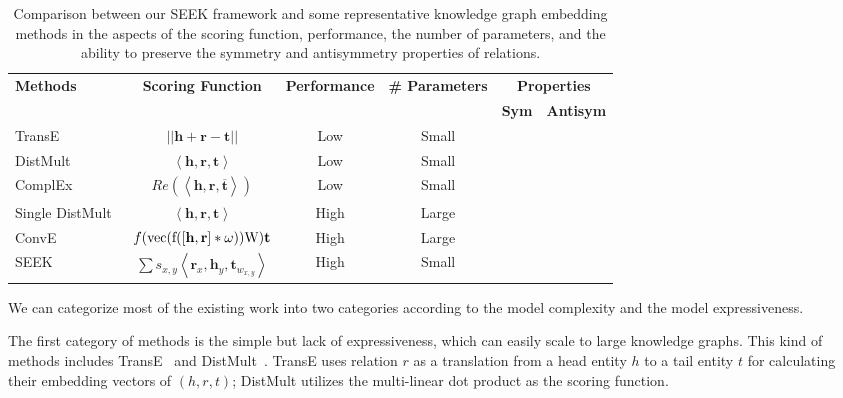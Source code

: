 \documentclass[11pt,a4paper]{article}
\newcommand{\cmark}{\text{\ding{51}}}
\newcommand{\xmark}{\text{\ding{55}}}
\newcommand{\SegVec}[1]{\mathbf{#1}}
\newcommand{\TableSize}{\footnotesize} \renewcommand{\thefootnote}{\fnsymbol{footnote}}
\begin{document}
\begin{table*}[!h]
	\centering
	\TableSize
	\begin{tabular}{ l |c| c | c | c c}
		\toprule
		\multirow{2}{*}{\textbf{Methods}} & \multirow{2}{*}{\textbf{Scoring Function}} &  \multirow{2}{*}{\textbf{Performance}} & \multirow{2}{*}{\textbf{\# Parameters}} &\multicolumn{2}{c}{\textbf{Properties}} \\
		\cmidrule{5-6}
		& & & & \textbf{Sym}  & \textbf{Antisym}\\
		\midrule
		TransE~\cite{bordes2013translating} & $||\SegVec{h} + \SegVec{r} -\SegVec{t}||$ & Low & Small & \xmark & \cmark\\
		DistMult~\cite{yang2015embedding} & $\left< \SegVec{h}, \SegVec{r}, \SegVec{t} \right>$ & Low  & Small & \cmark & \xmark\\
ComplEx~\cite{trouillon2016complex} & $Re(\left<\SegVec{h}, \SegVec{r}, \overline{\SegVec{t}} \right>)$ & Low   & Small  & \cmark & \cmark\\
		Single DistMult~\cite{kadlec2017knowledge} &$\left< \SegVec{h}, \SegVec{r}, \SegVec{t} \right>$ & High  & Large & \cmark & \xmark\\
		ConvE~\cite{dettmers2018conve} & $f(\rm{vec}(f([\SegVec{h},\SegVec{r}]*\omega))\rm{W})\SegVec{t}$& High  & Large & \xmark &  \cmark\\
		\midrule
		SEEK & $\sum s_{x, y} \left< \SegVec{r}_x, \SegVec{h}_y, \SegVec{t}_{w_{x, y}} \right>$  & High  & Small & \cmark & \cmark\\
		\bottomrule
	\end{tabular}
	\caption{Comparison between our SEEK framework and some representative knowledge graph embedding methods in the aspects of the scoring function, performance, the number of parameters, and the ability to preserve the symmetry and antisymmetry properties of relations.}	
	\label{tab:compare}
\end{table*}

We can categorize most of the existing work into two categories according to the model complexity and the model expressiveness.

The first category of methods is the simple but lack of expressiveness, which can easily scale to large knowledge graphs. This kind of methods includes TransE~\cite{bordes2013translating} and DistMult~\cite{yang2015embedding}. TransE uses relation $r$ as a translation from a head entity $h$ to a tail entity $t$ for calculating their embedding vectors of $(h, r, t)$; DistMult utilizes the multi-linear dot product as the scoring function.
\end{document}
